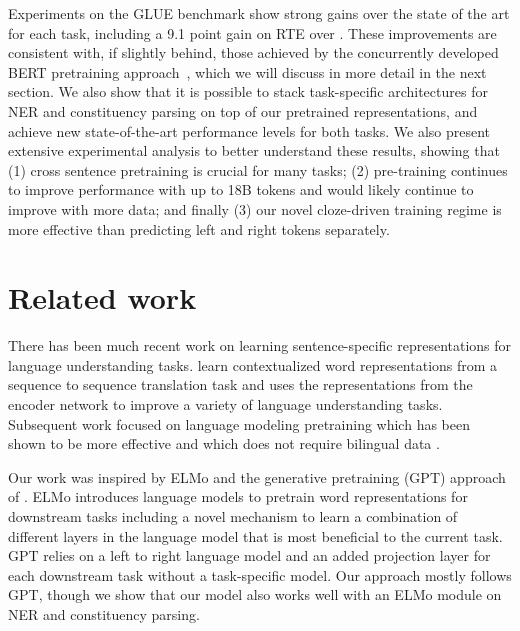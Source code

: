 \documentclass[11pt,a4paper]{article}
\begin{document}
Experiments on the GLUE \citep{wang2018glue} benchmark show strong gains over the state of the art for each task, including a 9.1 point gain on RTE over \citet{radford2018unsup}. These improvements are consistent with, if slightly behind, those achieved by the concurrently developed BERT pretraining approach~\citep{devlin2018bert}, which we will discuss in more detail in the next section. We also show that it is possible to stack task-specific architectures for NER and constituency parsing on top of our pretrained representations, and achieve new state-of-the-art performance levels for both tasks. 
We also present extensive experimental analysis to better understand these results, showing that (1)  cross sentence pretraining is crucial for many tasks; (2) pre-training continues to improve performance with up to 18B tokens and would likely continue to improve with more data; and finally (3) our novel cloze-driven training regime is more effective than predicting left and right tokens separately.




\section{Related work}

There has been much recent work on learning sentence-specific representations for language understanding tasks.
\citet{mccann2017cove} learn contextualized word representations from a sequence to sequence translation task and uses the representations from the encoder network to improve a variety of language understanding tasks.
Subsequent work focused on language modeling pretraining which has been shown to be more effective and which does not require bilingual data \citep{zhang2018lm}.

Our work was inspired by ELMo \citep{peters2018acl} and the generative pretraining (GPT) approach of \citet{radford2018unsup}. 
ELMo introduces language models to pretrain word representations for downstream tasks including a novel mechanism to learn a combination of different layers in the language model that is most beneficial to the current task. 
GPT relies on a left to right language model and an added projection layer for each downstream task without a task-specific model.
Our approach mostly follows GPT, though we show that our model also works well with an ELMo module on NER and constituency parsing.
\end{document}
